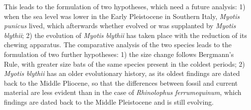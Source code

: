 {This leads to the formulation of two hypotheses, which need a future analysis: 1) when the sea level was lower in the Early Pleistocene in Southern Italy, \emph{Myotis punicus} lived, which afterwards whether evolved or was supplanted by \emph{Myotis blythii}; 2) the evolution of \emph{Myotis blythii} has taken place with the reduction of its chewing apparatus. The comparative analysis of the two species leads to the formulation of two further hypotheses: 1) the size change follows Bergmann's Rule, with greater size bats of the same species present in the coldest periods; 2) \emph{Myotis blythii} has an older evolutionary history, as its oldest findings are dated back to the Middle Pliocene, so that the differences between fossil and current material are less evident than in the case of \emph{Rhinolophus ferrumequinum}, which findings are dated back to the Middle Pleistocene and is still evolving.
} %